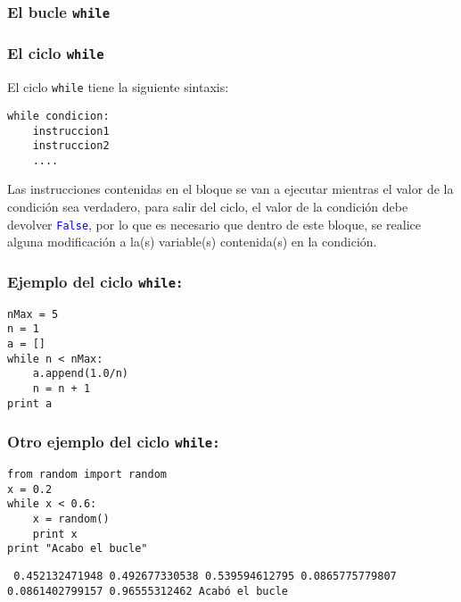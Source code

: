 \subsubsection{El bucle \texttt{while}}
\begin{frame}[fragile]
\frametitle{El ciclo \texttt{while}}
El ciclo \texttt{while} tiene la siguiente sintaxis:
\\
\medskip
\begin{verbatim}
while condicion:
    instruccion1
    instruccion2
    ....
\end{verbatim}
Las instrucciones contenidas en el bloque se van a ejecutar mientras el valor de la condición sea verdadero, para salir del ciclo, el valor de la condición debe devolver \textcolor{blue}{\texttt{False}}, por lo que es necesario que dentro de este bloque, se realice alguna modificación a la(s) variable(s) contenida(s) en la condición.
\end{frame}
\begin{frame}[fragile]
\frametitle{Ejemplo del ciclo \texttt{while:}}
\begin{lstlisting}
nMax = 5
n = 1
a = [] 
while n < nMax:
    a.append(1.0/n) 
    n = n + 1
print a
\end{lstlisting}
\end{frame}
\begin{frame}[fragile]
\frametitle{Otro ejemplo del ciclo \texttt{while:}}
\begin{minipage}{5.5cm}
\begin{lstlisting}
from random import random
x = 0.2
while x < 0.6:
    x = random()
    print x
print "Acabo el bucle"
\end{lstlisting}
\end{minipage}
\hspace{1cm}
\pause
\begin{minipage}{4cm}
\texttt{
0.452132471948
0.492677330538
0.539594612795
0.0865775779807
0.0861402799157
0.96555312462
Acabó el bucle
}
\end{minipage}
\end{frame}
